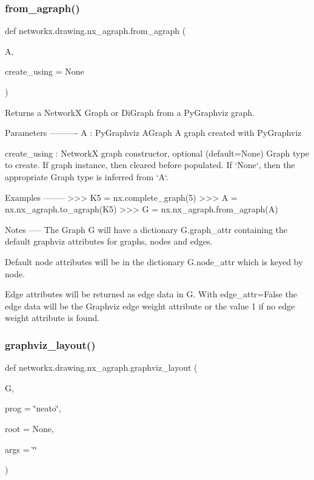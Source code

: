 \subsubsection{\texorpdfstring{from\+\_\+agraph()}{from\_agraph()}}
{\footnotesize\ttfamily def networkx.\+drawing.\+nx\+\_\+agraph.\+from\+\_\+agraph (\begin{DoxyParamCaption}\item[{}]{A,  }\item[{}]{create\+\_\+using = {\ttfamily None} }\end{DoxyParamCaption})}

\begin{DoxyVerb}Returns a NetworkX Graph or DiGraph from a PyGraphviz graph.

Parameters
----------
A : PyGraphviz AGraph
  A graph created with PyGraphviz

create_using : NetworkX graph constructor, optional (default=None)
   Graph type to create. If graph instance, then cleared before populated.
   If `None`, then the appropriate Graph type is inferred from `A`.

Examples
--------
>>> K5 = nx.complete_graph(5)
>>> A = nx.nx_agraph.to_agraph(K5)
>>> G = nx.nx_agraph.from_agraph(A)

Notes
-----
The Graph G will have a dictionary G.graph_attr containing
the default graphviz attributes for graphs, nodes and edges.

Default node attributes will be in the dictionary G.node_attr
which is keyed by node.

Edge attributes will be returned as edge data in G.  With
edge_attr=False the edge data will be the Graphviz edge weight
attribute or the value 1 if no edge weight attribute is found.\end{DoxyVerb}
 \mbox{\label{namespacenetworkx_1_1drawing_1_1nx__agraph_a02ed5ceb36a0fb5a7ce9321472854d7d}} 
\subsubsection{\texorpdfstring{graphviz\+\_\+layout()}{graphviz\_layout()}}
{\footnotesize\ttfamily def networkx.\+drawing.\+nx\+\_\+agraph.\+graphviz\+\_\+layout (\begin{DoxyParamCaption}\item[{}]{G,  }\item[{}]{prog = {\ttfamily \char`\"{}neato\char`\"{}},  }\item[{}]{root = {\ttfamily None},  }\item[{}]{args = {\ttfamily \char`\"{}\char`\"{}} }\end{DoxyParamCaption})}

